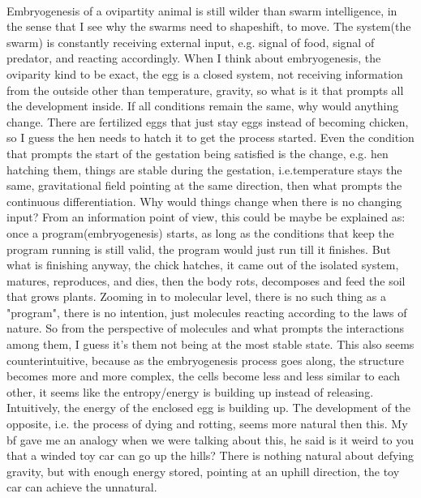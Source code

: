 \documentclass{article}
\begin{document}
\paragraph{}
Embryogenesis of a ovipartity animal is still wilder than swarm intelligence, in the sense that I see why the swarms need to shapeshift, to move. The system(the swarm) is constantly receiving external input, e.g. signal of food, signal of predator, and reacting accordingly. When I think about embryogenesis, the oviparity kind to be exact, the egg is a closed system, not receiving information from the outside other than temperature, gravity, so what is it that prompts all the development inside. If all conditions remain the same, why would anything change. There are fertilized eggs that just stay eggs instead of becoming chicken, so I guess the hen needs to hatch it to get the process started. Even the condition that prompts the start of the gestation being satisfied is the change, e.g. hen hatching them, things are stable during the gestation, i.e.temperature stays the same, gravitational field pointing at the same direction, then what prompts the continuous differentiation. Why would things change when there is no changing input? From an information point of view, this could be maybe be explained as: once a program(embryogenesis) starts, as long as the conditions that keep the program running is still valid, the program would just run till it finishes. But what is finishing anyway, the chick hatches, it came out of the isolated system, matures, reproduces, and dies, then the body rots, decomposes and feed the soil that grows plants. Zooming in to molecular level, there is no such thing as a "program", there is no intention, just molecules reacting according to the laws of nature. So from the perspective of molecules and what prompts the interactions among them, I guess it's them not being at the most stable state. This also seems counterintuitive, because as the embryogenesis process goes along, the structure becomes more and more complex, the cells become less and less similar to each other, it seems like the entropy/energy is building up instead of releasing. Intuitively, the energy of the enclosed egg is building up. The development of the opposite, i.e. the process of dying and rotting, seems more natural then this. My bf gave me an analogy when we were talking about this, he said is it weird to you that a winded toy car can go up the hills? There is nothing natural about defying gravity, but with enough energy stored, pointing at an uphill direction, the toy car can achieve the unnatural. 
\end{document}

